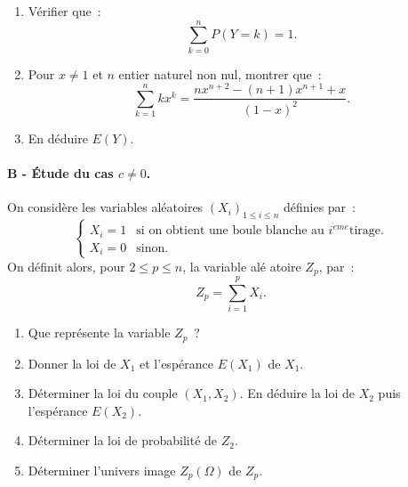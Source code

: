 \begin{exercice}
\begin{enumerate}
\item V\'{e}rifier que~: 
\begin{equation*}
\sum_{k=0}^{n}P(Y=k)=1.
\end{equation*}

\item Pour $x\neq 1$ et $n$ entier naturel non nul, montrer que~: 
\begin{equation*}
\sum_{k=1}^{n}kx^{k}=\frac{nx^{n+2}-(n+1)x^{n+1}+x}{(1-x)^{2}}.
\end{equation*}

\item En d\'{e}duire $E(Y)$.
\end{enumerate}

\paragraph{\small{B - \'Etude du cas $c\neq 0$.}\\}

On consid\`{e}re les variables al\'{e}atoires $\left( X_{i}\right)
_{1\leqslant i\leqslant n}$ d\'{e}finies par~: 
\begin{equation*}
\begin{cases}
X_{i}=1 & \text{si on obtient une boule blanche au }i^{\grave{e}me}\text{
tirage.} \\ 
X_{i}=0 & \text{sinon.}%
\end{cases}%
\end{equation*}%
On d\'{e}finit alors, pour $2\leqslant p\leqslant n$, la variable al\'{e}%
atoire $Z_{p}$, par~: 
\begin{equation*}
Z_{p}=\sum_{i=1}^{p}X_{i}.
\end{equation*}

\begin{enumerate}
\item Que repr\'{e}sente la variable $Z_{p}$~?

\item Donner la loi de $X_{1}$ et l'esp\'{e}rance $E(X_{1})$ de $X_{1}$.

\item D\'{e}terminer la loi du couple $(X_{1},X_{2})$. En d\'{e}duire la loi
de $X_{2}$ puis l'esp\'{e}rance $E(X_{2})$.

\item D\'{e}terminer la loi de probabilit\'{e} de $Z_{2}$.

\item D\'{e}terminer l'univers image $Z_{p}\left( \Omega \right) $ de $Z_{p} 
$.


\end{enumerate}
\end{exercice}
